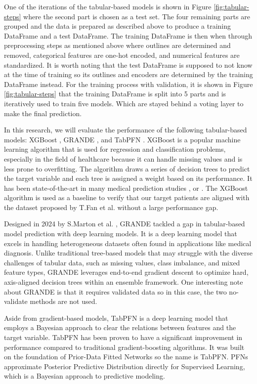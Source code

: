 \documentclass[sn-mathphys-num]{sn-jnl}%
\theoremstyle{thmstyleone}%
\theoremstyle{thmstyletwo}%
\theoremstyle{thmstylethree}%
\begin{document}
One of the iterations of the tabular-based models is shown in Figure \ref{fig:tabular-steps} where the second part is chosen as a test set.
The four remaining parts are grouped and the data is prepared as described above to produce a training DataFrame and a test DataFrame.
The training DataFrame is then when through preprocessing steps as mentioned above where outlines are determined and removed, categorical features are one-hot encoded, and numerical features are standardized.
It is worth noting that the test DataFrame is supposed to not know at the time of training so its outlines and encoders are determined by the training DataFrame instead.
For the training process with validation, it is shown in Figure \ref{fig:tabular-steps} that the training DataFrame is split into 5 parts and is iteratively used to train five models.
Which are stayed behind a voting layer to make the final prediction. 

In this research, we will evaluate the performance of the following tabular-based models: XGBoost \cite{xgboost-source}, GRANDE \cite{GRANDE-source}, and TabPFN \cite{tabpfn}.
XGBoost is a popular machine learning algorithm that is used for regression and classification problems, especially in the field of healthcare because it can handle missing values and is less prone to overfitting.
The algorithm draws a series of decision trees to predict the target variable and each tree is assigned a weight based on its performance.
It has been state-of-the-art in many medical prediction studies \cite{other-xgboost-aki}, \cite{other-xgboost-mimic} or \cite{other-xgboost-mimic-2}.
The XGBoost algorithm is used as a baseline to verify that our target patients are aligned with the dataset proposed by T.Fan et al. \cite{xgboost-aki-dka} without a large performance gap.

Designed in 2024 by S.Marton et al. \cite{GRANDE-source}, GRANDE tackled a gap in tabular-based model prediction with deep learning models.
It is a deep learning model that excels in handling heterogeneous datasets often found in applications like medical diagnosis.
Unlike traditional tree-based models that may struggle with the diverse challenges of tabular data, such as missing values, class imbalance, and mixed feature types, GRANDE leverages end-to-end gradient descent to optimize hard, axis-aligned decision trees within an ensemble framework.
One interesting note about GRANDE is that it requires validated data so in this case, the two no-validate methods are not used.


Aside from gradient-based models, TabPFN \cite{tabpfn} is a deep learning model that employs a Bayesian approach to clear the relations between features and the target variable. 
TabPFN has been proven to have a significant improvement in performance compared to traditional gradient-boosting algorithms.
It was built on the foundation of Prior-Data Fitted Networks so the name is TabPFN.
PFNs approximate Posterior Predictive Distribution directly for Supervised Learning, which is a Bayesian approach to predictive modeling.
\end{document}
